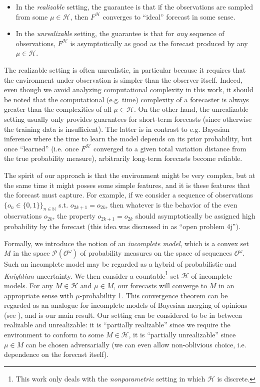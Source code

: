 \documentclass[11pt]{article}
\theoremstyle{definition}
\theoremstyle{plain}
\newcommand{\Nats}{\mathbb{N}}
\newcommand{\PM}{\mathcal{P}}
\newcommand{\Ob}{\mathcal{O}}
\newcommand{\OO}{\Ob^\omega}
\newcommand{\PMO}{\PM(\OO)}
\newcommand{\MC}{\mathcal{H}}
\begin{document}
\begin{itemize}
\item 
In the \emph{realizable} setting, the guarantee is that if the observations are sampled from some $\mu \in \MC$, then $F^\MC$ converges to \enquote{ideal} forecast in some sense.
\item
In the \emph{unrealizable} setting, the guarantee is that for \emph{any} sequence of observations, $F^\MC$ is asymptotically as good as the forecast produced by any $\mu \in \MC$.
\end{itemize}

The realizable setting is often unrealistic, in particular because it requires that the environment under observation is simpler than the observer itself. Indeed, even though we avoid analyzing computational complexity in this work, it should be noted that the computational (e.g. time) complexity of a forecaster is always greater than the complexities of all $\mu \in \MC$. On the other hand, the unrealizable setting usually only provides guarantees for short-term forecasts (since otherwise the training data is insufficient). The latter is in contrast to e.g. Bayesian inference where the time to learn the model depends on its prior probability, but once \enquote{learned} (i.e. once $F^\MC$ converged to a given total variation distance from the true probability measure), arbitrarily long-term forecasts become reliable.

The spirit of our approach is that the environment might be very complex, but at the same time it might posses some simple features, and it is these features that the forecast must capture. For example, if we consider a sequence of observations $\{o_n \in \{0,1\}\}_{n \in \Nats}$ s.t. $o_{2k+1}=o_{2k}$, then whatever is the behavior of the even observations $o_{2k}$, the property $o_{2k+1}=o_{2k}$ should asymptotically be assigned high probability by the forecast (this idea was discussed in \cite{Hutter_2009} as \enquote{open problem 4j}).

Formally, we introduce the notion of an \emph{incomplete model}, which is a convex set $M$ in the space $\PMO$ of probability measures on the space of sequences $\OO$. Such an incomplete model may be regarded as a hybrid of probabilistic and \emph{Knightian} uncertainty. We then consider a countable\footnote{This work only deals with the \emph{nonparametric} setting in which $\MC$ is discrete.} set $\MC$ of incomplete models. For any $M \in \MC$ and $\mu \in M$, our forecasts will converge to $M$ in an appropriate sense with $\mu$-probability 1. This convergence theorem can be regarded as an analogue for incomplete models of Bayesian merging of opinions (see \cite{Blackwell_1962}), and is our main result. Our setting can be considered to be in between realizable and unrealizable: it is \enquote{partially realizable} since we require the environment to conform to some $M \in \MC$, it is \enquote{partially unrealizable} since $\mu \in M$ can be chosen adversarially (we can even allow non-oblivious choice, i.e. dependence on the forecast itself).
\end{document}
